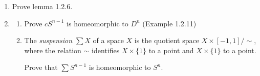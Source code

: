 \documentclass[12pt,a4paper]{report}
\newcommand{\BLUE}[1]{\textcolor{blue}{#1}}
\begin{document}
\begin{enumerate}[label=1.3.\arabic*]
	\BLUE{Show that homotopy, $\sim$, is reflexive, symmetric and transitive.
	\begin{itemize}
		\item \textbf{Reflexive}  Given $f: X \to Y$.  Let $h: X \times [0,1] \to Y$ such that $h(x,0) = f(x)$ and $h(x,1) = f(x)$ and, just to be clear, $h(x,t) = f(x)$ for all $t \in [0,1]$.  $h$ is a homotopy therefore $f \sim f$.
		\item \textbf{Symmetric}  Let $f : X \to X$ and $g: X \to X$.  If $f \sim g$ then $\exists h(x,t): X \times [0,1] \to Y \implies h(x,0) = f(x) \AND h(x,1) = g(x)$  that is smooth with $t$.  So, let $k(x,t) = h(x,1-t)$.  It is clear that $k$ is smooth and that $k(x,0) = h(x,1) = g(x) \AND k(x,1) = h(x,0) = f(x)$.  Therefore, $k$ is a homotopy and $g \sim f$.
		\item \textbf{Transitive} Let $f : X \to X, g: X \to X$ and $h: X \to X$. Also $f \sim g$ and $g \sim h$.  Therefore, $\exists h:X\times[0,1] \to X \AND k:X\times[0,1]\to X$ such that 
		\begin{align*}
			\exists h:X&\times[0,1] \to X \AND k:X\times[0,1]\to X \\
		\implies l(x,0) &= f(x) \AND l(x,0) = f(x) \AND l(x,1)=g(x) \\ 
			k(x,1) &= h(x) \AND k(x,0) = g(x), \, k(x,1) = h(x) \\
			\text{construct } H(x, t): X &\times [0,1] \to X, \, h(x,t) = \BINDEF{l(x, 2t), & t \in [0,1/2]}{k(x, 2(t-1/2) ), & t \in (1/2, 1]}
		\end{align*}
	\end{itemize}
	}
	
	\item Prove lemma 1.2.6.
	
	\item \begin{enumerate}
		\item Prove $cS^{n-1}$ is homeomorphic to $D^n$ (Example 1.2.11)
		\item The \textit{suspension} $\sum X$ of a space $X$ is the quotient space $X\times [-1,1]/\sim$, where the relation $\sim$ identifies $X\times\{1\}$ to a point and $X\times\{1\}$ to a point.
		
		Prove that $\sum S^{n-1}$ is homeomorphic to $S^n$.		
\end{enumerate}		
\end{enumerate}
\end{document}
